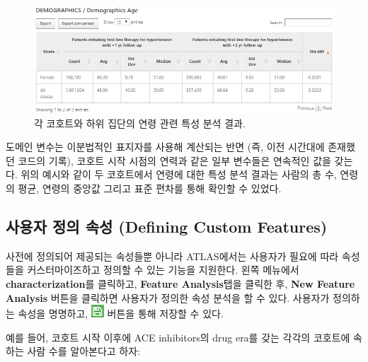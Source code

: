 \documentclass[11pt]{book}
\theoremstyle{definition}
\theoremstyle{definition}
\theoremstyle{definition}
\theoremstyle{remark}
\begin{document}
\begin{figure}

{\centering \includegraphics[width=1\linewidth]{images/Characterization/atlasCharacterizationResultsContinuous} 

}

\caption{각 코호트와 하위 집단의 연령 관련 특성 분석 결과.}\label{fig:atlasCharacterizationResultsContinuous}
\end{figure}

도메인 변수는 이분법적인 표지자를 사용해 계산되는 반면 (즉, 이전
시간대에 존재했던 코드의 기록), 코호트 시작 시점의 연력과 같은 일부
변수들은 연속적인 값을 갖는다. 위의 예시와 같이 두 코호트에서 연령에
대한 특성 분석 결과는 사람의 총 수, 연령의 평균, 연령의 중앙값 그리고
표준 편차를 통해 확인할 수 있었다.

\subsection{사용자 정의 속성 (Defining Custom
Features)}\label{---defining-custom-features}

사전에 정의되어 제공되는 속성들뿐 아니라 ATLAS에서는 사용자가 필요에
따라 속성들을 커스터마이즈하고 정의할 수 있는 기능을 지원한다. 왼쪽
메뉴에서 \textbf{characterization}를 클릭하고, \textbf{Feature
Analysis}탭을 클릭한 후, \textbf{New Feature Analysis} 버튼을 클릭하면
사용자가 정의한 속성 분석을 할 수 있다. 사용자가 정의하는 속성을
명명하고, \includegraphics{images/PopulationLevelEstimation/save.png}
버튼을 통해 저장할 수 있다. 

예를 들어, 코호트 시작 이후에 ACE inhibitors의 drug era를 갖는 각각의
코호트에 속하는 사람 수를 알아본다고 하자:
\end{document}
